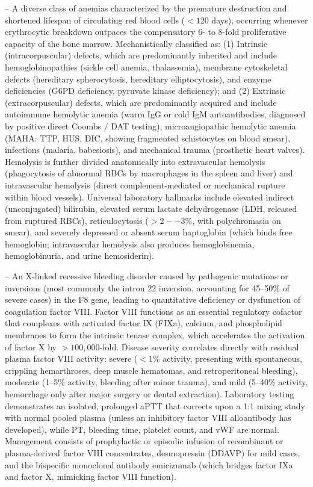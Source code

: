 -- A diverse class of anemias characterized by the premature destruction and shortened lifespan of circulating red blood cells ($<120$ days), occurring whenever erythrocytic breakdown outpaces the compensatory 6- to 8-fold proliferative capacity of the bone marrow. Mechanistically classified as: (1) Intrinsic (intracorpuscular) defects, which are predominantly inherited and include hemoglobinopathies (sickle cell anemia, thalassemia), membrane cytoskeletal defects (hereditary spherocytosis, hereditary elliptocytosis), and enzyme deficiencies (G6PD deficiency, pyruvate kinase deficiency); and (2) Extrinsic (extracorpuscular) defects, which are predominantly acquired and include autoimmune hemolytic anemia (warm IgG or cold IgM autoantibodies, diagnosed by positive direct Coombs / DAT testing), microangiopathic hemolytic anemia (MAHA: TTP, HUS, DIC, showing fragmented schistocytes on blood smear), infections (malaria, babesiosis), and mechanical trauma (prosthetic heart valves). Hemolysis is further divided anatomically into extravascular hemolysis (phagocytosis of abnormal RBCs by macrophages in the spleen and liver) and intravascular hemolysis (direct complement-mediated or mechanical rupture within blood vessels). Universal laboratory hallmarks include elevated indirect (unconjugated) bilirubin, elevated serum lactate dehydrogenase (LDH, released from ruptured RBCs), reticulocytosis ($>2--3\%$, with polychromasia on smear), and severely depressed or absent serum haptoglobin (which binds free hemoglobin; intravascular hemolysis also produces hemoglobinemia, hemoglobinuria, and urine hemosiderin).

-- An X-linked recessive bleeding disorder caused by pathogenic mutations or inversions (most commonly the intron 22 inversion, accounting for 45--50\% of severe cases) in the F8 gene, leading to quantitative deficiency or dysfunction of coagulation factor VIII. Factor VIII functions as an essential regulatory cofactor that complexes with activated factor IX (FIXa), calcium, and phospholipid membranes to form the intrinsic tenase complex, which accelerates the activation of factor X by $>100,000$-fold. Disease severity correlates directly with residual plasma factor VIII activity: severe ($<1\%$ activity, presenting with spontaneous, crippling hemarthroses, deep muscle hematomas, and retroperitoneal bleeding), moderate (1--5\% activity, bleeding after minor trauma), and mild (5--40\% activity, hemorrhage only after major surgery or dental extraction). Laboratory testing demonstrates an isolated, prolonged aPTT that corrects upon a 1:1 mixing study with normal pooled plasma (unless an inhibitory factor VIII alloantibody has developed), while PT, bleeding time, platelet count, and vWF are normal. Management consists of prophylactic or episodic infusion of recombinant or plasma-derived factor VIII concentrates, desmopressin (DDAVP) for mild cases, and the bispecific monoclonal antibody emicizumab (which bridges factor IXa and factor X, mimicking factor VIII function).

